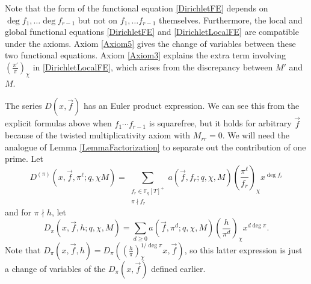 \documentclass[11pt,letterpaper]{article}
\theoremstyle{definition}
\theoremstyle{remark}
\numberwithin{equation}{section}
\theoremstyle{dotless}
\newcommand{\F}{\mathbb{F}}
\newcommand{\res}[2]{\left(\frac{#1}{#2}\right)}
\begin{document}

Note that the form of the functional equation \eqref{DirichletFE} depends on $\deg f_1, \ldots \deg f_{r-1}$ but not on $f_1, \ldots f_{r-1}$ themselves. Furthermore, the local and global functional equations \eqref{DirichletFE} and \eqref{DirichletLocalFE} are compatible under the axioms. Axiom \ref{Axiom5} gives the change of variables between these two functional equations. Axiom \ref{Axiom3} explains the extra term involving $\res{\pi'}{\pi}_\chi$ in \eqref{DirichletLocalFE}, which arises from the discrepancy between $M'$ and $M$.

The series $D(x,\vec{f})$ has an Euler product expression. We can see this from the explicit formulas above when $f_1\cdots f_{r-1}$ is squarefree, but it holds for arbitrary $\vec{f}$ because of the twisted multiplicativity axiom with $M_{rr}=0$. We will need the analogue of Lemma \ref{LemmaFactorization} to separate out the contribution of one prime. Let 
\begin{equation}
    D^{(\pi)}(x, \vec{f}, \pi^{\ell}; q, \chi M) = \sum_{\substack{f_r \in \F_q[T]^+\\ \pi \nmid f_r}} a(\vec{f}, f_r; q, \chi, M) \res{\pi^{\ell}}{f_r}_{\chi} x^{\deg f_r}
\end{equation}
and for $\pi \nmid h$, let 
\begin{equation}
    D_{\pi}(x, \vec{f}, h; q, \chi, M) = \sum_{d \geq 0} a(\vec{f}, \pi^d; q, \chi, M) \res{h}{\pi^d}_{\chi} x^{d \deg \pi}.
\end{equation}
Note that $D_{\pi}(x, \vec{f}, h) = D_{\pi}\left(\res{h}{\pi}_{\chi}^{1/\deg\pi} x, \vec{f}\right)$, so this latter expression is just a change of variables of the $D_{\pi}(x, \vec{f})$ defined earlier.
\end{document}
